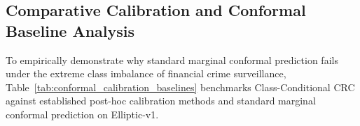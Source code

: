 \subsection{Comparative Calibration and Conformal Baseline Analysis}
To empirically demonstrate why standard marginal conformal prediction fails under the extreme class imbalance of financial crime surveillance, Table~\ref{tab:conformal_calibration_baselines} benchmarks Class-Conditional CRC against established post-hoc calibration methods and standard marginal conformal prediction on Elliptic-v1.

\begin{table}[htbp]
\centering
\caption[Comparative Evaluation of Conformal Risk Control Baselines]{Comparative Evaluation of Conformal Risk Control against Calibration and Conformal Baselines on Elliptic-v1 ($\alpha=0.01$, Nominal Coverage $99.0\%$).}
\label{tab:conformal_calibration_baselines}
\par\vspace{6pt}

\end{table}
